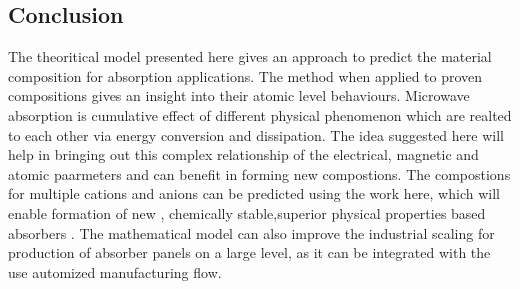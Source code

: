 \documentclass[journal]{IEEEtran}
\begin{document}
\begin{multicols}{2}
%
%







\section{Conclusion}
The theoritical model presented here gives an approach to predict the material composition for absorption applications. The method when applied to proven compositions gives an insight into their atomic level behaviours. Microwave  absorption is cumulative effect of different physical phenomenon which are realted to each other via energy conversion and dissipation. The idea suggested here will help in bringing out this complex relationship of the electrical, magnetic and atomic paarmeters and can benefit in forming new compostions. The compostions for multiple cations and anions can be predicted using the work here, which will enable formation of new , chemically stable,superior physical properties based absorbers . The mathematical model can also improve the industrial scaling for production of absorber panels on  a large level, as it can be integrated with the use automized manufacturing flow.





\end{multicols}
\end{document}
